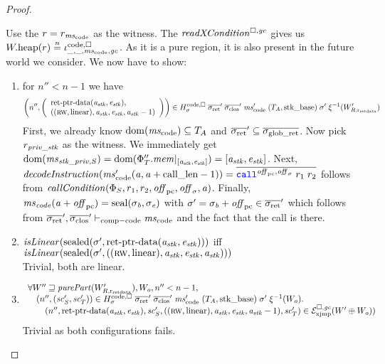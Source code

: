 \begin{proof}
\begin{description}
    Use the $r=r_{\mscode}$ as the witness.
    The $\xReadCond{}$ gives us $\pwheap(r) \nequal \codereg{\_,\_,\mscode,\gc}$.
    As it is a pure region, it is also present in the future world we consider.
    We now have to show:
    \begin{enumerate}[label=\alph*)]
    \item for $n'' < n-1$ we have
      \[\npair[n'']{\left(\array{l}\retptrd(\aaddr_\stk,\eaddr_\stk),\\((\rw,\linear),\aaddr_\stk,\eaddr_\stk,\aaddr_\stk-1)\endarray\right)}
        \in H^\mathrm{code,\square}_\sigma \; \sigrets' \; \sigcloss' \; \mscode'
        \; (\ta,\stkb) \; \sigma' \; \xi^{-1}(W_{R,\rretd}')
      \]
      First, we already know $\dom(\mscode) \subseteq \ta$ and $\sigrets' \subseteq \gsigrets$.
      Now pick $r_{\mathit{priv\_stk}}$ as the witness.
      We immediately get $\mathrm{dom}(\mathit{ms}_{\mathit{stk}\_\mathit{priv},S}) = \mathrm{dom}(\Phi_T''.\mathit{mem}|_{[\mathit{a}_{\mathit{stk}},\mathit{e}_{\mathit{stk}}]}) = [\mathit{a}_{\mathit{stk}},\mathit{e}_{\mathit{stk}}]$.
      Next, $\decInstr{\mscode'(\aaddr,\aaddr+\calllen-1)} = \overline{\scall{\offpc,\offsigma}{r_1}{r_2}}$ follows from $\callCond{\Phi_S,r_1,r_2,\offpc,\offsigma,\aaddr}$.
      Finally, $\mathit{ms}_{\mathit{code}}(\mathit{a}+\mathit{off}_{\mathrm{pc}}) = \mathrm{seal}(\sigma_{\mathit{b}},\sigma_{\mathit{e}})$ with $\sigma' = \sigma_\baddr + \offpc \in \sigrets'$ which follows from $\sigrets',\sigcloss' \vdash_{\mathrm{comp-code}} \mscode$ and the fact that the call is there.
    \item $\isLinear{\sealed{\sigma',\retptrd(\aaddr_\stk,\eaddr_\stk)}}$ iff
      $\isLinear{\sealed{\sigma',((\rw,\linear),\aaddr_\stk,\eaddr_\stk,\aaddr_\stk)}}$\\
      Trivial, both are linear.
    \item
      \[
        \begin{array}{l}
          \forall W'' \future \purePart{W_{R,\rretd}'}, W_o, n'' < n-1,\\
          \quad\npair[n'']{(\vsc_S',\vsc_T')}
          \in  H^\mathrm{code,\square}_\sigma \; \sigrets' \; \sigcloss' \; \mscode'
          \; (\ta,\stkb) \; \sigma' \; \xi^{-1}(W_o) \ldotp \\
          \qquad\npair[n'']{\retptrd(\aaddr_\stk,\eaddr_\stk),\vsc_S',((\rw,\linear),\aaddr_\stk,\eaddr_\stk,\aaddr_\stk-1),\vsc_T'} \in
          \lrexj(W'\oplus W_o))
        \end{array}
      \]
      Trivial as both configurations fails.
    \end{enumerate}


\end{description}
\end{proof}
